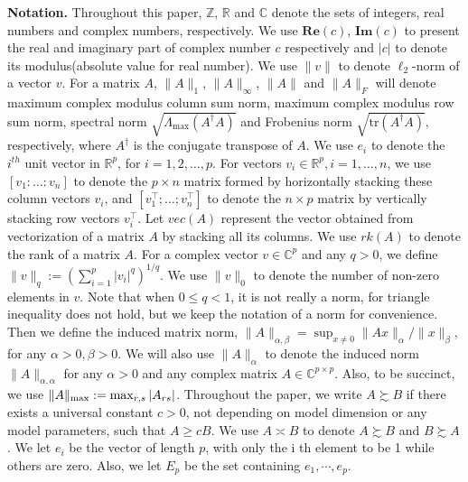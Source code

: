 \textbf{Notation.} Throughout this paper, $\mathbb{Z}$, $\mathbb{R}$ and $\mathbb{C}$  denote the sets of integers, real numbers and complex numbers, respectively. We use 
$\mathbf{Re}(c)$, $\mathbf{Im}(c)$ to present the real and imaginary part of complex number $c$ respectively and $|c|$ to denote its modulus(absolute value for real number). We use $\|v\|$ to denote $\ell_2$-norm of a vector $v$. For a matrix $A$, $\|A\|_1$, $\|A\|_{\infty}$, $\|A\|$ and $\|A\|_F$ will denote maximum complex modulus column sum norm, maximum complex modulus row sum norm, { spectral norm} $\sqrt{\Lambda_{\max}(A^\dag A)}$ and Frobenius norm $\sqrt{\text{tr}(A^\dag A)}$, respectively, where $A^\dag$ is the conjugate transpose of $A$.  We use $e_i$ to denote the $i^{th}$ unit vector in $\mathbb{R}^p$, for $i = 1, 2, \ldots, p$. For vectors $v_i \in \mathbb{R}^p, i=1,\ldots, n$, we use $[v_1:\ldots:v_n]$ to denote the $p \times n$ matrix formed  by horizontally stacking these column vectors $v_i$, and  $[v_1^\top;\ldots; v_n^\top]$ to denote the $n\times p$ matrix by vertically stacking row vectors $v_i^\top$. Let $vec(A)$ represent the vector obtained from vectorization of a matrix $A$ by stacking all its columns. We use $rk(A)$ to denote the rank of a matrix $A$. For a complex vector $v\in \mathbb{C}^p$ and any $q > 0$, we define $\|v\|_q:= (\sum_{i=1}^p |v_i|^q)^{1/q}$. We use $\|v\|_0$ to denote the number of non-zero elements in $v$. Note that when $0\le q<1$, it is not really a norm, for triangle inequality does not hold, but we keep the notation of a norm for convenience. Then we define the induced matrix norm, $\|A\|_{\alpha, \beta} = \sup_{x\neq 0}\|Ax\|_\alpha/\|x\|_\beta$, for any  $\alpha>0, \beta>0$. We will also use $\|A\|_\alpha$ to denote the induced norm $\|A\|_{\alpha, \alpha}$ for any $\alpha > 0$ and any complex matrix $A \in \mathbb{C}^{p \times p}$. Also, to be succinct, we use $\|A\|_{\rm{max}} :=\max_{r,s}|A_{rs}|$. 
Throughout the paper, we write $A \succsim B$ if there exists a  universal constant $c > 0$, not depending on model dimension or any model parameters, such that $A \ge cB$. We use $A \asymp B$ to denote $A \succsim B$ and $B \succsim A$.  We let $e_i$ be the vector of length $p$, with only the i th element to be 1 while others are zero. Also, we let $E_p$ be the set containing $e_1, \cdots, e_p$. 









